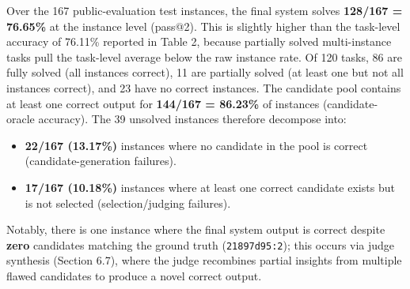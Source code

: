 \documentclass[11pt]{article}
\providecommand{\tightlist}{%
  \setlength{\itemsep}{0pt}\setlength{\parskip}{0pt}}
\begin{document}
Over the 167 public-evaluation test instances, the final system solves
\textbf{128/167 = 76.65\%} at the instance level (pass@2). This is
slightly higher than the task-level accuracy of 76.11\% reported in
Table 2, because partially solved multi-instance tasks pull the
task-level average below the raw instance rate. Of 120 tasks, 86 are
fully solved (all instances correct), 11 are partially solved (at least
one but not all instances correct), and 23 have no correct instances.
The candidate pool contains at least one correct output for
\textbf{144/167 = 86.23\%} of instances (candidate-oracle accuracy). The
39 unsolved instances therefore decompose into:

\begin{itemize}
\tightlist
\item
  \textbf{22/167 (13.17\%)} instances where no candidate in the pool is
  correct (candidate-generation failures).
\item
  \textbf{17/167 (10.18\%)} instances where at least one correct
  candidate exists but is not selected (selection/judging failures).
\end{itemize}

Notably, there is one instance where the final system output is correct
despite \textbf{zero} candidates matching the ground truth
(\texttt{21897d95:2}); this occurs via judge synthesis (Section 6.7),
where the judge recombines partial insights from multiple flawed
candidates to produce a novel correct output.
\end{document}

